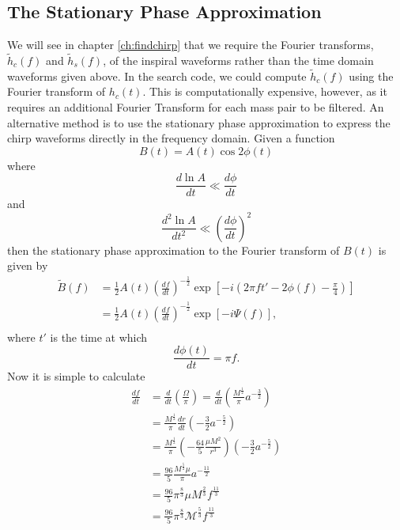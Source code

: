 \subsection{The Stationary Phase Approximation}
\label{ss:stationaryphase}

We will see in chapter \ref{ch:findchirp} that we require the Fourier
transforms, $\tilde{h}_c(f)$ and $\tilde{h}_s(f)$, of the inspiral waveforms
rather than the time domain waveforms given above. In the search code, we
could compute $\tilde{h}_c(f)$ using the Fourier transform of $h_c(t)$.
This is computationally expensive, however, as it requires an additional
Fourier Transform for each mass pair to be filtered. An alternative 
method is to use the stationary phase approximation\cite{Mathews:1992} to
express the chirp waveforms directly in the frequency
domain\cite{WillWiseman:1996,Cutler:1994}. Given a function
\begin{equation}
B(t) = A(t) \cos 2 \phi(t)
\end{equation}
where
\begin{equation}
\frac{d\ln A}{dt} \ll \frac{d\phi}{dt}
\end{equation}
and
\begin{equation}
\frac{d^2\ln A}{dt^2} \ll \left(\frac{d\phi}{dt}\right)^2
\end{equation}
then the stationary phase approximation to the Fourier transform of $B(t)$ is
given by
\begin{equation}
\begin{split}
\tilde{B}(f) &= \frac{1}{2} A(t) \left(\frac{df}{dt}\right)^{-\frac{1}{2}}
\exp\left[ -i \left(2\pi f t' - 2 \phi(f) - \frac{\pi}{4} \right)\right] \\
&= \frac{1}{2} A(t) \left(\frac{df}{dt}\right)^{-\frac{1}{2}}
\exp\left[ -i \Psi(f) \right], \\
\end{split}
\label{eq:spexpression}
\end{equation}
where $t'$ is the time at which
\begin{equation}
\frac{d\phi(t)}{dt} = \pi f.
\end{equation}
Now it is simple to calculate
\begin{align}
\label{eq:spdfdt}
\frac{df}{dt} 
     &= \frac{d}{dt} \left(\frac{\Omega}{\pi}\right) 
      = \frac{d}{dt} \left(\frac{M^\frac{1}{2}}{\pi} a^{-\frac{3}{2}}\right) \\
     &= \frac{M^\frac{1}{2}}{\pi} \frac{dr}{dt} \left(-\frac{3}{2} a^{-\frac{5}{2}}\right) \\
     &= \frac{M^\frac{1}{2}}{\pi} \left(-\frac{64}{5} \frac{\mu M^2}{r^3}\right)
        \left(-\frac{3}{2} a^{-\frac{5}{2}}\right) \\
     &= \frac{96}{5} \frac{M^\frac{5}{2} \mu}{\pi} a^{-\frac{11}{2}} \\
&= \frac{96}{5} \pi^\frac{8}{3} \mu M^\frac{2}{3} f^\frac{11}{3} \\
&= \frac{96}{5} \pi^\frac{8}{3} \mathcal{M}^\frac{5}{3} f^\frac{11}{3}
\end{align}

